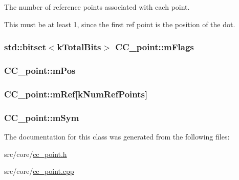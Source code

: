 The number of reference points associated with each point. 

This must be at least 1, since the first ref point is the position of the dot. \hypertarget{a00034_a676172a1cc4a700a9c3662155c8b06a8}{
\subsubsection[{m\-Flags}]{\setlength{\rightskip}{0pt plus 5cm}std\-::bitset$<${\bf k\-Total\-Bits}$>$ C\-C\-\_\-point\-::m\-Flags\hspace{0.3cm}{\ttfamily [private]}}}\label{a00034_a676172a1cc4a700a9c3662155c8b06a8}
\hypertarget{a00034_a01cdfaad90c4b25418c94e3e17e119a1}{
\subsubsection[{m\-Pos}]{ C\-C\-\_\-point\-::m\-Pos\hspace{0.3cm}{\ttfamily [private]}}}\label{a00034_a01cdfaad90c4b25418c94e3e17e119a1}
\hypertarget{a00034_acb88e94b06850fed4fb44fa9fe095fc0}{
\subsubsection[{m\-Ref}]{ C\-C\-\_\-point\-::m\-Ref\mbox{[}{\bf k\-Num\-Ref\-Points}\mbox{]}\hspace{0.3cm}{\ttfamily [private]}}}\label{a00034_acb88e94b06850fed4fb44fa9fe095fc0}
\hypertarget{a00034_a43c6a5906d61451a1bc48635faf44721}{
\subsubsection[{m\-Sym}]{ C\-C\-\_\-point\-::m\-Sym\hspace{0.3cm}{\ttfamily [private]}}}\label{a00034_a43c6a5906d61451a1bc48635faf44721}


The documentation for this class was generated from the following files\-:\begin{DoxyCompactItemize}
\item 
src/core/\hyperlink{a00208}{cc\-\_\-point.\-h}\item 
src/core/\hyperlink{a00207}{cc\-\_\-point.\-cpp}\end{DoxyCompactItemize}
